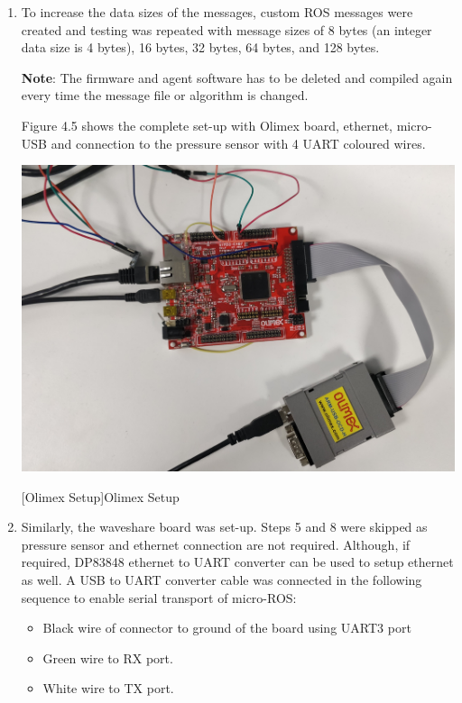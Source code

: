 \documentclass[%
xelatex,
	oneside,		%
	12pt,			%
	parskip=half,	%
	abstracton,
	chapterprefix=true%
    appendixprefix=true]
{scrbook}
\begin{document}
\begin{enumerate}
\begin{center}
[Delay Test]{Delay Test}
\label{fig:delay}
\end{center}
\item To increase the data sizes of the messages, custom ROS messages were created and testing was repeated with message sizes of 8 bytes (an integer data size is 4 bytes), 16 bytes, 32 bytes, 64 bytes, and 128 bytes.
 
{\bfseries Note}: The firmware and agent software has to be deleted and compiled again every time the message file or algorithm is changed.

Figure 4.5 shows the complete set-up with Olimex board, ethernet, micro-USB and connection to the pressure sensor with 4 UART coloured wires.
\begin{center}
\includegraphics[scale=0.1]{fig/olimex.jpg}

[Olimex Setup]{Olimex Setup}
\label{fig:olimexsetup}
\end{center}
\item Similarly, the waveshare board was set-up. Steps 5 and 8 were skipped as pressure sensor and ethernet connection are not required. Although, if required, DP83848 ethernet to UART converter can be used to setup ethernet as well. A USB to UART converter cable was connected in the following sequence to enable serial transport of micro-ROS: 
\begin{itemize}
\item Black wire of connector to ground of the board using UART3 port
\item Green wire to RX port.
\item White wire to TX port.
\end{itemize}


\end{enumerate}
\end{document}
